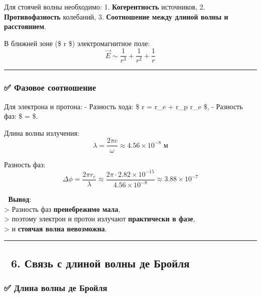 \documentclass[11pt]{article}
\begin{document}
Для стоячей волны необходимо: 1. \textbf{Когерентность} источников, 2.
\textbf{Противофазность} колебаний, 3. \textbf{Соотношение между длиной
волны и расстоянием}.

В ближней зоне (\$ r \ll \lambda \$) электромагнитное поле: \[
\vec{E} \sim \frac{1}{r^3} + \frac{1}{r^2} + \frac{1}{r}
\]

\begin{center}\rule{0.5\linewidth}{\linethickness}\end{center}

\subsubsection{✅ Фазовое
соотношение}\label{ux444ux430ux437ux43eux432ux43eux435-ux441ux43eux43eux442ux43dux43eux448ux435ux43dux438ux435}

Для электрона и протона: - Разность хода: \$ \Delta r = r\_e + r\_p
\approx r\_e \$, - Разность фаз: \$ \Delta \phi =
 \$.

Длина волны излучения: \[
\lambda = \frac{2\pi c}{\omega} \approx 4.56 \times 10^{-8} \text{ м}
\]

Разность фаз: \[
\Delta \phi = \frac{2\pi r_e}{\lambda} \approx \frac{2\pi \cdot 2.82 \times 10^{-15}}{4.56 \times 10^{-8}} \approx 3.88 \times 10^{-7}
\]

📌 \textbf{Вывод}:\\
\textgreater{} Разность фаз \textbf{пренебрежимо мала},\\
\textgreater{} поэтому электрон и протон излучают \textbf{практически в
фазе},\\
\textgreater{} и \textbf{стоячая волна невозможна}.

\begin{center}\rule{0.5\linewidth}{\linethickness}\end{center}

\subsection{🔹 6. Связь с длиной волны де
Бройля}\label{ux441ux432ux44fux437ux44c-ux441-ux434ux43bux438ux43dux43eux439-ux432ux43eux43bux43dux44b-ux434ux435-ux431ux440ux43eux439ux43bux44f}

\subsubsection{✅ Длина волны де
Бройля}\label{ux434ux43bux438ux43dux430-ux432ux43eux43bux43dux44b-ux434ux435-ux431ux440ux43eux439ux43bux44f}
\end{document}

